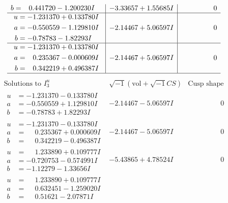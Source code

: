 \documentclass[1p]{elsarticle_modified}
\theoremstyle{definition}
\newcommand{\I}{\sqrt{-1}}
\begin{document}
$$\begin{array}{c|c|c}
\begin{aligned}
b &= \phantom{-}0.441720 - 1.200230 I\end{aligned}
 & -3.33657 + 1.55685 I & \phantom{-0.000000 } 0 \\ \hline\begin{aligned}
u &= -1.231370 + 0.133780 I \\
a &= -0.550559 - 1.129810 I \\
b &= -0.78783 - 1.82293 I\end{aligned}
 & -2.14467 + 5.06597 I & \phantom{-0.000000 } 0 \\ \hline\begin{aligned}
u &= -1.231370 + 0.133780 I \\
a &= \phantom{-}0.235367 - 0.000609 I \\
b &= \phantom{-}0.342219 + 0.496387 I\end{aligned}
 & -2.14467 + 5.06597 I & \phantom{-0.000000 } 0\\
 \hline 
 \end{array}$$\newpage$$\begin{array}{c|c|c}  
\text{Solutions to }I^u_{3}& \I (\text{vol} + \sqrt{-1}CS) & \text{Cusp shape}\\
 \hline 
\begin{aligned}
u &= -1.231370 - 0.133780 I \\
a &= -0.550559 + 1.129810 I \\
b &= -0.78783 + 1.82293 I\end{aligned}
 & -2.14467 - 5.06597 I & \phantom{-0.000000 } 0 \\ \hline\begin{aligned}
u &= -1.231370 - 0.133780 I \\
a &= \phantom{-}0.235367 + 0.000609 I \\
b &= \phantom{-}0.342219 - 0.496387 I\end{aligned}
 & -2.14467 - 5.06597 I & \phantom{-0.000000 } 0 \\ \hline\begin{aligned}
u &= \phantom{-}1.233890 + 0.109777 I \\
a &= -0.720753 - 0.574991 I \\
b &= -1.12279 - 1.33656 I\end{aligned}
 & -5.43865 + 4.78524 I & \phantom{-0.000000 } 0 \\ \hline\begin{aligned}
u &= \phantom{-}1.233890 + 0.109777 I \\
a &= \phantom{-}0.632451 - 1.259020 I \\
b &= \phantom{-}0.51621 - 2.07871 I\end{aligned}

\end{array}$$
\end{document}
